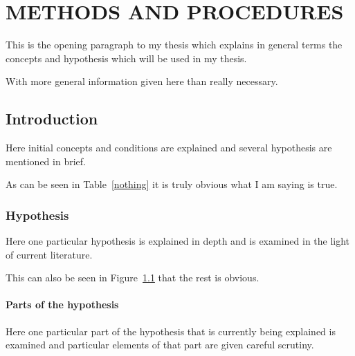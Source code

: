 \chapter{METHODS AND PROCEDURES}

This is the opening paragraph to my thesis which
explains in general terms the concepts and hypothesis
which will be used in my thesis.

With more general information given here than really
necessary.

\section{Introduction}

Here initial concepts and conditions are explained and
several hypothesis are mentioned in brief.

As can be seen in Table~\ref{nothing} it is truly
obvious what I am saying is true.

\begin{table}[h!tb] \centering
{}
\label{nothing}

\vspace{ 2 in}
\end{table}

\subsection{Hypothesis}

Here one particular hypothesis is explained in depth
and is examined in the light of current literature.

This can also be seen in Figure~\ref{moon} that the
rest is obvious.

\begin{figure}[h!tb] \centering

\vspace{ 2 in}
\label{moon}
\end{figure}

\subsubsection{Parts of the hypothesis}

Here one particular part of the hypothesis that is 
currently being explained is examined and particular
elements of that part are given careful scrutiny.

